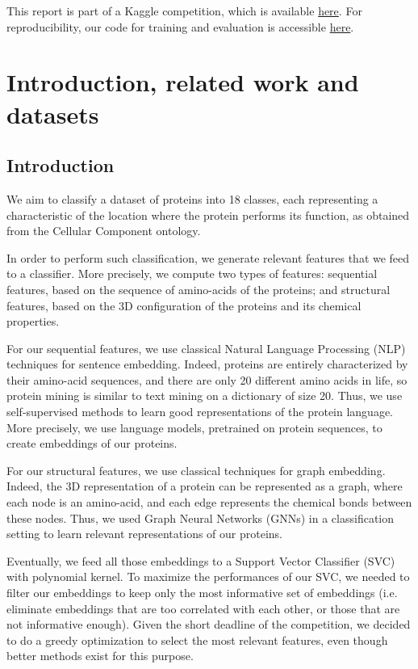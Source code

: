\documentclass[final]{cvpr}
\begin{document}
This report is part of a Kaggle competition, which is available \href{https://www.kaggle.com/competitions/altegrad-2022/overview}{here}. For reproducibility, our code for training and evaluation is accessible \href{https://github.com/DentanJeremie/Altegrad-Protein-Prediction.git}{here}. 

\section{Introduction, related work and datasets}

\subsection{Introduction}

 We aim to classify a dataset of proteins into 18 classes, each representing a characteristic of the location where the protein performs its function, as obtained from the Cellular Component ontology. 
 
 In order to perform such classification, we generate relevant features that we feed to a classifier. More precisely, we compute two types of features: sequential features, based on the sequence of amino-acids of the proteins; and structural features, based on the 3D configuration of the proteins and its chemical properties.

For our sequential features, we use classical Natural Language Processing (NLP) techniques for sentence embedding. Indeed, proteins are entirely characterized by their amino-acid sequences, and there are only 20 different amino acids in life, so protein mining is similar to text mining on a dictionary of size 20. Thus, we use self-supervised methods to learn good representations of the protein language. More precisely, we use language models, pretrained on protein sequences, to create embeddings of our proteins. 

For our structural features, we use classical techniques for graph embedding. Indeed, the 3D representation of a protein can be represented as a graph, where each node is an amino-acid, and each edge represents the chemical bonds between these nodes. Thus, we used Graph Neural Networks (GNNs) in a classification setting to learn relevant representations of our proteins.

Eventually, we feed all those embeddings to a Support Vector Classifier (SVC) with polynomial kernel. To maximize the performances of our SVC, we needed to filter our embeddings to keep only the most informative set of embeddings (i.e. eliminate embeddings that are too correlated with each other, or those that are not informative enough). Given the short deadline of the competition, we decided to do a greedy optimization to select the most relevant features, even though better methods exist for this purpose.
\end{document}
